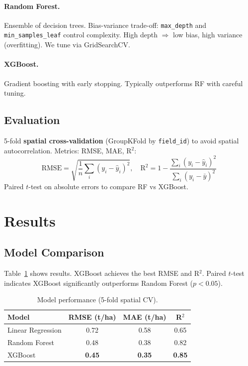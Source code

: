 \documentclass[conference]{IEEEtran}
\begin{document}
\paragraph{Random Forest.} Ensemble of decision trees. Bias-variance trade-off: \texttt{max\_depth} and \texttt{min\_samples\_leaf} control complexity. High depth $\Rightarrow$ low bias, high variance (overfitting). We tune via GridSearchCV.

\paragraph{XGBoost.} Gradient boosting with early stopping. Typically outperforms RF with careful tuning.

\subsection{Evaluation}
5-fold \textbf{spatial cross-validation} (GroupKFold by \texttt{field\_id}) to avoid spatial autocorrelation. Metrics: RMSE, MAE, R$^2$:
\begin{equation}
  \text{RMSE} = \sqrt{\frac{1}{n}\sum_i (y_i - \hat{y}_i)^2}, \quad
  \text{R}^2 = 1 - \frac{\sum_i (y_i - \hat{y}_i)^2}{\sum_i (y_i - \bar{y})^2}
\end{equation}
Paired $t$-test on absolute errors to compare RF vs XGBoost.

\section{Results}
\label{sec:results}

\subsection{Model Comparison}
Table~\ref{tab:results} shows results. XGBoost achieves the best RMSE and R$^2$. Paired $t$-test indicates XGBoost significantly outperforms Random Forest ($p < 0.05$).

\begin{table}[t]
  \centering
  \caption{Model performance (5-fold spatial CV).}
  \label{tab:results}
  \begin{tabular}{lccc}
    \toprule
    Model & RMSE (t/ha) & MAE (t/ha) & R$^2$ \\
    \midrule
    Linear Regression & 0.72 & 0.58 & 0.65 \\
    Random Forest     & 0.48 & 0.38 & 0.82 \\
    XGBoost           & \textbf{0.45} & \textbf{0.35} & \textbf{0.85} \\
    \bottomrule
  \end{tabular}
\end{table}
\end{document}
